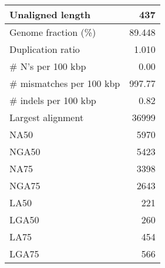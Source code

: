 \documentclass[12pt,a4paper]{article}
\begin{document}
\begin{table}[ht]
\begin{center}
\begin{tabular}{|l*{1}{|r}|}
Unaligned length & 437 \\ \hline
Genome fraction (\%) & 89.448 \\ \hline
Duplication ratio & 1.010 \\ \hline
\# N's per 100 kbp & 0.00 \\ \hline
\# mismatches per 100 kbp & 997.77 \\ \hline
\# indels per 100 kbp & 0.82 \\ \hline
Largest alignment & 36999 \\ \hline
NA50 & 5970 \\ \hline
NGA50 & 5423 \\ \hline
NA75 & 3398 \\ \hline
NGA75 & 2643 \\ \hline
LA50 & 221 \\ \hline
LGA50 & 260 \\ \hline
LA75 & 454 \\ \hline
LGA75 & 566 \\ \hline
\end{tabular}
\end{center}
\end{table}
\end{document}
